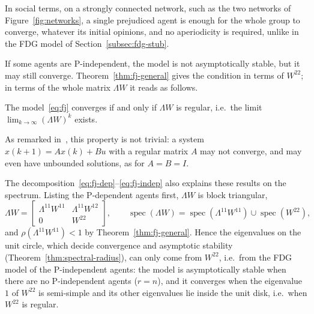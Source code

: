 In social terms, on a strongly connected network, such as the two networks of
Figure~\ref{fig:networks}, a single prejudiced agent is enough for the whole group to
converge, whatever its initial opinions, and no aperiodicity is required, unlike in the
FDG model of Section~\ref{subsec:fdg-stub}.

If some agents are P-independent, the model is not asymptotically stable, but it may
still converge. Theorem~\ref{thm:fj-general} gives the condition in terms
of $W^{22}$; in terms of the whole matrix $\Lambda W$ it reads as follows.

\begin{corollary}
\label{cor:fj-regular}
The model~\eqref{eq:fj} converges if and only if $\Lambda W$ is regular, i.e.\ the
limit $\lim_{k \to \infty} (\Lambda W)^k$ exists.
\end{corollary}

As remarked in~\cite{proskurnikov2017tutorial}, this property is not trivial: a system
$x(k+1) = A x(k) + B u$ with a regular matrix $A$ may not converge, and may even have
unbounded solutions, as for $A = B = I$.

The decomposition~\eqref{eq:fj-dep}--\eqref{eq:fj-indep} also explains these results on
the spectrum. Listing the P-dependent agents first, $\Lambda W$ is
block triangular,
\[
  \Lambda W = \begin{bmatrix} \Lambda^{11} W^{11} & \Lambda^{11} W^{12} \\ 0 & W^{22}
  \end{bmatrix},
  \qquad
  \operatorname{spec}(\Lambda W) = \operatorname{spec}(\Lambda^{11} W^{11}) \cup
  \operatorname{spec}(W^{22}),
\]
and $\rho(\Lambda^{11} W^{11}) < 1$ by Theorem~\ref{thm:fj-general}. Hence the
eigenvalues on the unit circle, which decide convergence and asymptotic stability
(Theorem~\ref{thm:spectral-radius}), can only come from $W^{22}$, i.e.\ from the FDG
model of the P-independent agents: the model is asymptotically stable when there are no
P-independent agents ($r = n$), and it converges when the eigenvalue $1$ of $W^{22}$ is
semi-simple and its other eigenvalues lie inside the unit disk, i.e.\ when $W^{22}$ is
regular.

